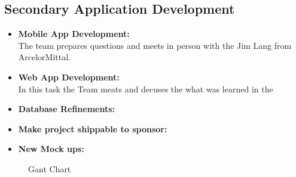 \documentclass[Letter,11pt]{article}
\begin{document}
	\subsection{Secondary Application Development}\label{dev2}
		
		\begin{itemize}
			\item\textbf{Mobile App Development:}\\
			The team prepares questions and meets in person with the Jim Lang from ArcelorMittal.
			
			\item \textbf{Web App Development:}\\
			In this task the Team meats and decuses the what was learned in the 
			
			\item\textbf{Database Refinements:}\\
			
			\item\textbf{Make project shippable to sponsor:}\\
			
			\item\textbf{New Mock ups:}\\
			
		\end{itemize}
		
		\begin{landscape}
			\begin{figure}
				
				\caption{\label{fig:gant}Gant Chart}
			\end{figure}
		\end{landscape}
	
\end{document}
